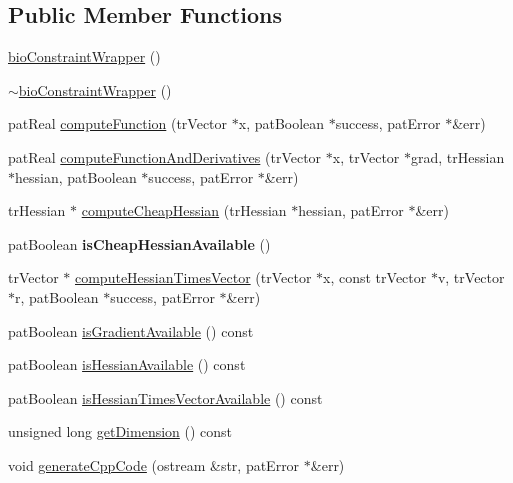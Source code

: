 \subsection*{Public Member Functions}
\begin{DoxyCompactItemize}
\item 
\hyperlink{classbio_constraint_wrapper_a2dafb721494ee39bf4a0e4ca51ab2ea2}{bio\+Constraint\+Wrapper} ()
\item 
\hyperlink{classbio_constraint_wrapper_a0a513bd767a15dc84ab221df49ee1823}{$\sim$bio\+Constraint\+Wrapper} ()
\item 
pat\+Real \hyperlink{classbio_constraint_wrapper_a63a339cbc90f002d3945b1c64286fbcc}{compute\+Function} (tr\+Vector $\ast$x, pat\+Boolean $\ast$success, pat\+Error $\ast$\&err)
\item 
pat\+Real \hyperlink{classbio_constraint_wrapper_abe425baa0389a902c1a4661e6d3ac6b9}{compute\+Function\+And\+Derivatives} (tr\+Vector $\ast$x, tr\+Vector $\ast$grad, tr\+Hessian $\ast$hessian, pat\+Boolean $\ast$success, pat\+Error $\ast$\&err)
\item 
tr\+Hessian $\ast$ \hyperlink{classbio_constraint_wrapper_aaf986bd228a7683a758c3f734aa72049}{compute\+Cheap\+Hessian} (tr\+Hessian $\ast$hessian, pat\+Error $\ast$\&err)
\item 
\mbox{\label{classbio_constraint_wrapper_a21e24ec31ead35f7966a48c7755209c0}} 
pat\+Boolean {\bfseries is\+Cheap\+Hessian\+Available} ()
\item 
tr\+Vector $\ast$ \hyperlink{classbio_constraint_wrapper_aed546d0393bc28c1d979d09a64650327}{compute\+Hessian\+Times\+Vector} (tr\+Vector $\ast$x, const tr\+Vector $\ast$v, tr\+Vector $\ast$r, pat\+Boolean $\ast$success, pat\+Error $\ast$\&err)
\item 
pat\+Boolean \hyperlink{classbio_constraint_wrapper_a0596646c9d8aec807c6dee7a952d2a3f}{is\+Gradient\+Available} () const
\item 
pat\+Boolean \hyperlink{classbio_constraint_wrapper_a0fd19dd1f500465fbc243b60526bd76b}{is\+Hessian\+Available} () const
\item 
pat\+Boolean \hyperlink{classbio_constraint_wrapper_a6757a8f4928e8dbd8f26dfe1a4f53877}{is\+Hessian\+Times\+Vector\+Available} () const
\item 
unsigned long \hyperlink{classbio_constraint_wrapper_a8af31cb2b229ca6a4b99ba2f18ca0f15}{get\+Dimension} () const
\item 
void \hyperlink{classbio_constraint_wrapper_adf39800047df8d751b337f6f250af705}{generate\+Cpp\+Code} (ostream \&str, pat\+Error $\ast$\&err)
\end{DoxyCompactItemize}


